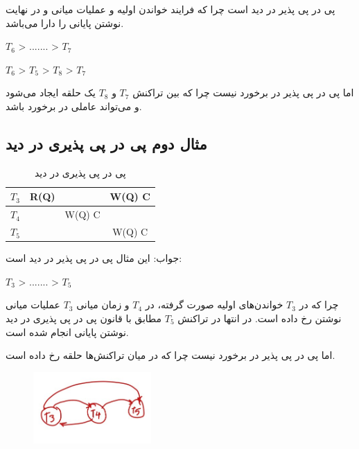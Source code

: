 \documentclass[a4paper]{article}
\begin{document}
پی در پی پذیر در دید است چرا که فرایند خواندن اولیه و عملیات میانی و در نهایت
نوشتن پایانی را دارا می‌باشد.

\begin{LTR}
    $T_{6}$ > ....... > $T_{7}$

    $T_{6}$ > $T_{5}$ > $T_{8}$ > $T_{7}$
\end{LTR}

اما پی در پی پذیر در برخورد نیست چرا که بین تراکنش $T_{7}$ و $T_{8}$ یک حلقه
ایجاد می‌شود و می‌تواند عاملی در برخورد باشد.

\newpage

\subsection{مثال دوم پی در پی پذیری در دید}

\begin{LTR}
    \begin{table}[h]
        \centering
        \begin{RTL}
            \caption{پی در پی پذیری در دید}
        \end{RTL}
        \begin{tabular}{c|c|c|c}
            $T_{3}$ & R(Q) & & W(Q) C \\ \hline
            $T_{4}$ & & W(Q) C &  \\ \hline
            $T_{5}$ & & & W(Q) C \\
        \end{tabular}
    \end{table}
\end{LTR}

جواب: این مثال پی در پی پذیر در دید است:

\begin{LTR}
    $T_{3}$ > ....... > $T_{5}$
\end{LTR}

چرا که در $T_{3}$ خواندن‌های اولیه صورت گرفته، در $T_{4}$ و زمان میانی $T_{3}$
عملیات میانی نوشتن رخ داده است. در انتها در تراکنش $T_{5}$ مطابق با قانون پی در
پی پذیری در دید نوشتن پایانی انجام شده است.

اما پی در پی پذیر در برخورد نیست چرا که در میان تراکنش‌ها حلقه رخ داده است.

\begin{figure}
    \centering
    \includegraphics[width=0.4\textwidth]{umls/vsr_exp_2.jpg}
\end{figure}
\end{document}

